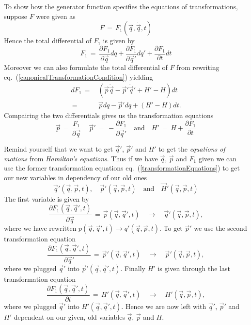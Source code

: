 To show how the generator function specifies the equations of transformations,
suppose $F$ were given as 
\begin{equation}
  F \,=\, F_1(\vec q, \dot{\vec q}, t)
\end{equation}
Hence the total differential of $F_1$ is given by
\begin{equation}
  F_1 \,=\, \frac{\partial F_1}{\partial \vec q} dq + \frac{\partial F_1}{\partial
\vec q'} dq' + \frac{\partial F_1}{\partial t} dt
\end{equation}
Moreover we can also formulate the total differential of $F$ from rewriting
eq.~(\ref{canonicalTransformationCondition}) yielding
\begin{equation}
  \begin{aligned}
    dF_1 \,=\,& ( \vec p \dot{\vec q} - \vec p' \dot{\vec q}' + H' - H )dt \\
    \,=\,& \vec pdq - \vec p'dq + (H'-H)dt.
  \end{aligned}
\end{equation}
Compairing the two differentials gives us the transformation equations
\begin{equation}
  \label{transformationEquations}
  \vec p \,=\, \frac{F_1}{\partial \vec q} \, \quad \vec p' \,=\, -
\frac{\partial F_1}{\partial \vec q'} \quad \text{and} \quad H' \,=\, H +
\frac{\partial F_1}{\partial t}
\end{equation}

Remind yourself that we want to get $\vec q'$, $\vec p'$ and $H'$ to get the
\textit{equations of motions} from \textit{Hamilton's equations}. Thus if we
have $\vec q$, $\vec p$ and $F_1$ given we can use the former transformation
equations eq.~(\ref{transformationEquations}) to get our new variables in
dependency of our old ones
\begin{equation}
  \vec q'(\vec q, \vec p, t), \quad \vec p'(\vec q, \vec p, t) \quad
\text{and} \quad \vec H'(\vec q, \vec p, t)
\end{equation}
The first variable is given by
\begin{equation}
  \frac{\partial F_1(\vec q, \vec q', t)}{\partial \vec q} \,=\, \vec p(\vec q,
\vec q', t) \quad \longrightarrow \quad \vec q' (\vec q, \vec p, t),
\end{equation}
where we have rewritten $p(\vec q, \vec q', t) \to q'(\vec q, \vec p, t)$. To
get $\vec p'$ we use the second transformation equation
\begin{equation}
  \frac{\partial F_1(\vec q, \vec q', t)}{\partial \vec q'} \,=\, \vec p'(\vec
q, \vec q', t) \quad \longrightarrow \quad \vec p'(\vec q,\vec p, t),
\end{equation}
where we plugged $\vec q'$ into $\vec p'(\vec q, \vec q', t)$. Finally $H'$ is
given through the last transformation equation
\begin{equation}
  \frac{\partial F_1(\vec q, \vec q', t)}{\partial t} \,=\, H'(\vec q, \vec q',
t) \quad \longrightarrow \quad H'(\vec q, \vec p, t),
\end{equation}
where we plugged $\vec q'$ into $H'(\vec q, \vec q', t)$. Hence we are now left
with $\vec q'$, $\vec p'$ and $H'$ dependent on our given, old variables $\vec
q$, $\vec p$ and $H$.

